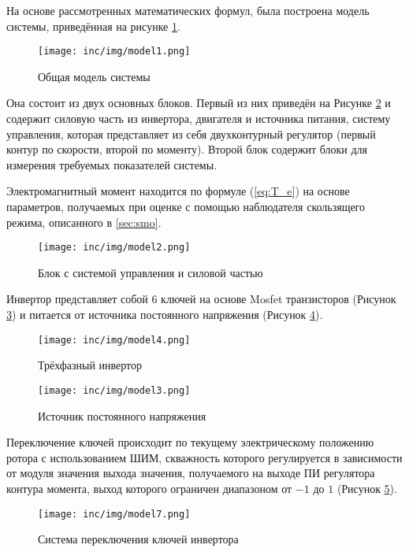 На основе рассмотренных математических формул, была построена модель системы, приведённая на рисунке \ref{pic:mod1}.

\begin{figure}[!h]
\centering
\texttt{[image: inc/img/model1.png]}
\caption{Общая модель системы}
\label{pic:mod1}
\end{figure}

Она состоит из двух основных блоков. Первый из них приведён на Рисунке \ref{pic:mod2} и содержит силовую часть из инвертора, двигателя и источника питания, систему управления, которая представляет из себя двухконтурный регулятор (первый контур по скорости, второй по моменту). Второй блок содержит блоки для измерения требуемых показателей системы.

Электромагнитный момент находится по формуле (\ref{eq:T_e}) на основе параметров, получаемых при оценке с помощью наблюдателя скользящего режима, описанного в \ref{sec:smo}.

\begin{figure}[!h]
\centering
\texttt{[image: inc/img/model2.png]}
\caption{Блок с системой управления и силовой частью}
\label{pic:mod2}
\end{figure}

Инвертор представляет собой 6 ключей на основе Mosfet транзисторов (Рисунок \ref{pic:mod4}) и питается от источника постоянного напряжения (Рисунок \ref{pic:mod3}).

\begin{figure}[!h]
\centering
\texttt{[image: inc/img/model4.png]}
\caption{Трёхфазный инвертор}
\label{pic:mod4}
\end{figure}

\begin{figure}[!h]
\centering
\texttt{[image: inc/img/model3.png]}
\caption{Источник постоянного напряжения}
\label{pic:mod3}
\end{figure}

Переключение ключей происходит по текущему электрическому положению ротора с использованием ШИМ, скважность которого регулируется в зависимости от модуля значения выхода значения, получаемого на выходе ПИ регулятора контура момента, выход которого ограничен диапазоном от $-1$ до $1$ (Рисунок \ref{pic:mod7}).

\begin{figure}[!h]
\centering
\texttt{[image: inc/img/model7.png]}
\caption{Система переключения ключей инвертора}
\label{pic:mod7}
\end{figure}
\clearpage


